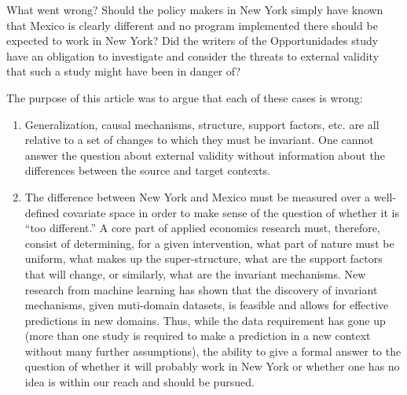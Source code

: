 \documentclass[a4paper,12pt]{article}
\begin{document}
What went wrong? Should the policy makers in New York simply have known that Mexico is clearly different and no program implemented there should be expected to work in New York? Did the writers of the Opportunidades study have an obligation to investigate and consider the threats to external validity that such a study might have been in danger of? 

The purpose of this article was to argue that each of these cases is wrong: 

\begin{enumerate}
\item Generalization, causal mechanisms, structure, support factors, etc. are all relative to a set of changes to which they must be invariant. One cannot answer the question about external validity without information about the differences between the source and target contexts. 

\item The difference between New York and Mexico must be measured over a well-defined covariate space in order to make sense of the question of whether it is ``too different.'' A core part of applied economics research must, therefore, consist of determining, for a given intervention, what part of nature must be uniform, what makes up the super-structure, what are the support factors that will change, or similarly, what are the invariant mechanisms. New research from machine learning has shown that the discovery of invariant mechanisms, given muti-domain datasets, is feasible and allows for effective predictions in new domains. Thus, while the data requirement has gone up (more than one study is required to make a prediction in a new context without many further assumptions), the ability to give a formal answer to the question of whether it will probably work in New York or whether one has no idea is within our reach and should be pursued. 
\end{enumerate}











\end{document}
